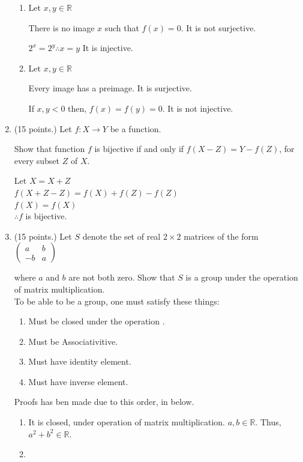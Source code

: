 \documentclass[12pt,fleqn]{article}
\begin{document}
\begin{enumerate}
\begin{enumerate}
\item Let $x , y \in \mathbb{R}$

 There is no image $x$ such that $ f(x)=0. $ It is not surjective.
 
 $2^x = 2^y \therefore x=y   $  It is injective.
  
\item Let $x , y \in \mathbb{R}$
 
 Every image has a preimage. It is surjective. 
 
 If $x,y < 0$ then, $f(x) = f(y) = 0. $ It is not injective.

\end{enumerate}

\item (15 points.) Let $f:X \rightarrow Y$ be a function. 

Show that function $  f  $ is bijective if and only if $f(X-Z)=Y-f(Z)$, for every subset \(Z\) of \(X\).

Let $X = X+Z$ \\
$f(X+Z-Z)=f(X)+f(Z)-f(Z)$\\
$f(X)=f(X)$\\
$\therefore f$ is bijective.

\item (15 points.) Let \(S\) denote the set of real $2 \times 2$ matrices of the form
$\begin{pmatrix} 
 a & b \\
-b & a 
\end{pmatrix}$

where \(a\) and \(b\) are not both zero. Show that \(S\) is a group under the operation of matrix multiplication.\\

To be able to be a group, one must satisfy these things: 
\begin{enumerate}
\item Must be closed under the operation .
\item Must be Associativitive.
\item Must have identity element.
\item Must have inverse element.
\end{enumerate}
Proofs has ben made due to this order, in below.

\begin{enumerate}


\item It is closed, under operation of matrix multiplication.
$a,b \in \mathbb{R}.$ Thus, $ a^2 + b^2 \in \mathbb{R}.$ 
\item 


\end{enumerate}
\end{enumerate}
\end{document}
